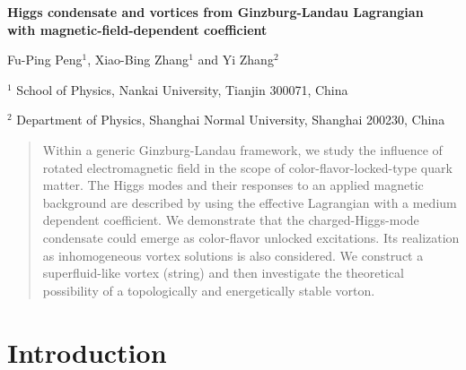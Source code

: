 \documentclass[12pt]{article}
\begin{document}
\vspace{0.5cm}
\begin{center}
	\Large \bf  Higgs condensate and vortices from Ginzburg-Landau Lagrangian\\
	\Large\bf   with magnetic-field-dependent coefficient
\end{center}

\vspace{1cm}
\centerline{ Fu-Ping Peng$^{1}$, Xiao-Bing Zhang$^{1}$ and Yi Zhang$^{2}$}
\centerline{\small $^{1}$ School of Physics, Nankai University, Tianjin  300071, China}
\centerline{\small $^{2}$ Department of Physics, Shanghai Normal University, Shanghai 200230, China}
 \vspace{0.5cm}

\begin{abstract}\rm \noindent
Within a generic Ginzburg-Landau framework, we study the influence of rotated electromagnetic field in the scope of color-flavor-locked-type quark matter. The Higgs modes and their responses to an applied magnetic background are described by using the effective Lagrangian with a medium dependent coefficient. We demonstrate that the charged-Higgs-mode condensate could emerge as  color-flavor unlocked excitations. Its realization as inhomogeneous vortex solutions is also considered. We construct a superfluid-like vortex (string) and then investigate the theoretical possibility of a topologically and energetically stable vorton.
\end{abstract}

\baselineskip 12pt

\section{\bf Introduction}

\end{document}
